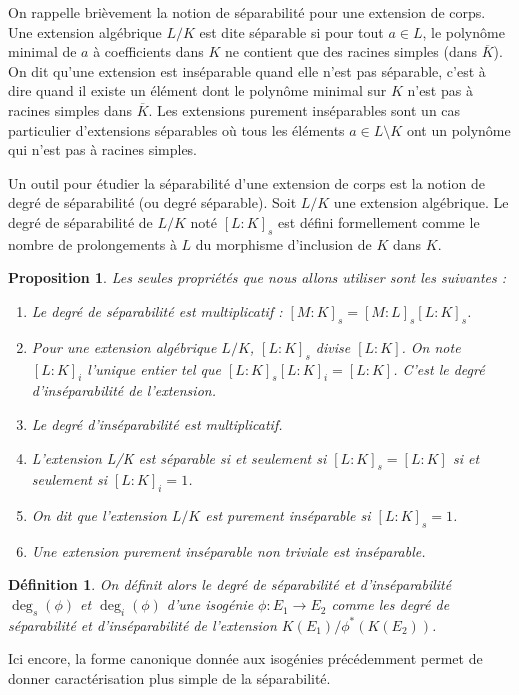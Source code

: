 \documentclass{article}
\theoremstyle{plain}%
\newtheorem{prop}[thm]{Proposition}
\newtheorem{deff}[thm]{Définition}
\theoremstyle{definition}%
\begin{document}
On rappelle brièvement la notion de séparabilité pour une extension de corps. Une extension algébrique $L/K$ est dite séparable si pour tout $a\in L$, le polynôme minimal de $a$ à coefficients dans $K$ ne contient que des racines simples (dans $\overline{K}$). On dit qu'une extension est inséparable quand elle n'est pas séparable, c'est à dire quand il existe un élément dont le polynôme minimal sur $K$ n'est pas à racines simples dans $\overline{K}$. Les extensions purement inséparables sont un cas particulier d'extensions séparables où tous les éléments $a\in L \setminus K$ ont un polynôme qui n'est pas à racines simples.

Un outil pour étudier la séparabilité d’une extension de corps est la notion de degré de séparabilité (ou
degré séparable). Soit $L/K$ une extension algébrique. Le degré de séparabilité de $L/K$ noté  $[L : K]_s$ est défini
formellement comme le nombre de prolongements à $L$ du morphisme d’inclusion de $K$ dans $K$. 

\begin{prop}
Les seules
propriétés que nous allons utiliser sont les suivantes :
  \begin{enumerate}
    \item Le degré de séparabilité est multiplicatif : $[M : K]_s = [M : L]_s [L : K]_s$.
    \item Pour une extension algébrique $L/K$, $[L : K]_s$ divise $[L : K]$. On note $[L:K]_i$ l'unique entier tel que $[L:K]_s[L:K]_i=[L:K]$. C'est le degré d'inséparabilité de l'extension. 
    \item Le degré d'inséparabilité est multiplicatif.
    \item L’extension L/K est séparable si et seulement si $[L : K]_s = [L : K]$ si et seulement si $[L:K]_i = 1$.
    \item On dit que l'extension $L/K$ est purement inséparable si $[L:K]_s = 1$.
    \item Une extension purement inséparable non triviale est inséparable.
  \end{enumerate}
\end{prop}


\begin{deff}
On définit alors le degré de séparabilité et d'inséparabilité $\deg_s(\phi)$ et $\deg_i(\phi)$ d’une isogénie $\phi : E_1 \to E_2$ comme les degré de séparabilité et d'inséparabilité de l’extension $K(E_1)/\phi^*(K(E_2 ))$.
\end{deff}


Ici encore, la forme canonique donnée aux isogénies précédemment permet de donner caractérisation plus
simple de la séparabilité.
\end{document}
